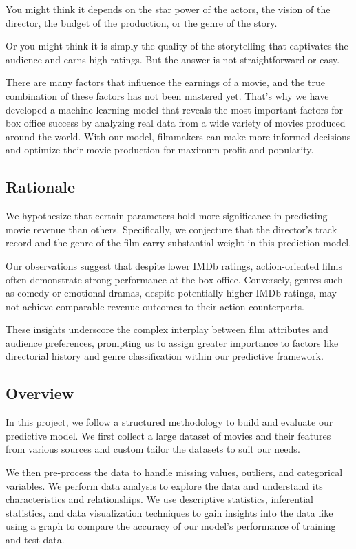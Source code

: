 \documentclass[conference]{IEEEtran}
\begin{document}
        You might think it depends on the star power of the actors, the vision of the director, the budget of the production, or the genre of the story.
        
        Or you might think it is simply the quality of the storytelling that captivates the audience and earns high ratings.
        But the answer is not straightforward or easy.
        
        There are many factors that influence the earnings of a movie, and the true combination of these factors has not been mastered yet.
        That’s why we have developed a machine learning model that reveals the most important factors for box office success by analyzing real data from a wide variety of movies produced around the world.
        With our model, filmmakers can make more informed decisions and optimize their movie production for maximum profit and popularity.

    \subsection{Rationale}
        We hypothesize that certain parameters hold more significance in predicting movie revenue than others. Specifically, we conjecture that the director's track record and the genre of the film carry substantial weight in this prediction model.
        
        Our observations suggest that despite lower IMDb ratings, action-oriented films often demonstrate strong performance at the box office. Conversely, genres such as comedy or emotional dramas, despite potentially higher IMDb ratings, may not achieve comparable revenue outcomes to their action counterparts. 
        
        These insights underscore the complex interplay between film attributes and audience preferences, prompting us to assign greater importance to factors like directorial history and genre classification within our predictive framework.

    \subsection{Overview}
        In this project, we follow a structured methodology to build and evaluate our predictive model. We first collect a large dataset of movies and their features from various sources and custom tailor the datasets to suit our needs.
        
        We then pre-process the data to handle missing values, outliers, and categorical variables. We perform data analysis to explore the data and understand its characteristics and relationships. We use descriptive statistics, inferential statistics, and data visualization techniques to gain insights into the data like using a graph to compare the accuracy of our model's performance of training and test data.
        
\end{document}
